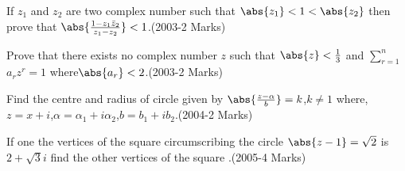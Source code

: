 \item If $z_{1}$ and $z_{2}$ are two complex number such that $\abs{z_{1}}<1<\abs{z_{2}}$ then prove that  $\abs{\frac{1-z_{1} \bar z_{2}}{z_{1}-z_{2}}}<1$.\hfill(2003-2 Marks)\\
\item Prove that there exists no complex number $z$ such that $\abs{z}<\frac{1}{3}$ and $\sum_{r=1}^{n}$$a_r$$z^{r}=1$ where$\abs{a_r}<2$.\hfill (2003-2 Marks)\\
\item Find the centre and radius  of circle given by $\abs{\frac{z-\alpha} b}=k$,$k\not=1$ where,$z=x+i$,$\alpha=\alpha_1+i\alpha_2$,$b=b_{1}+ib_{2}$.\hfill(2004-2 Marks)\\ 
\item If one the vertices of the square circumscribing the circle $\abs{z-1}=\sqrt{2}$ is $2+\sqrt{3}i$ find the other vertices of the square .\hfill (2005-4 Marks)
